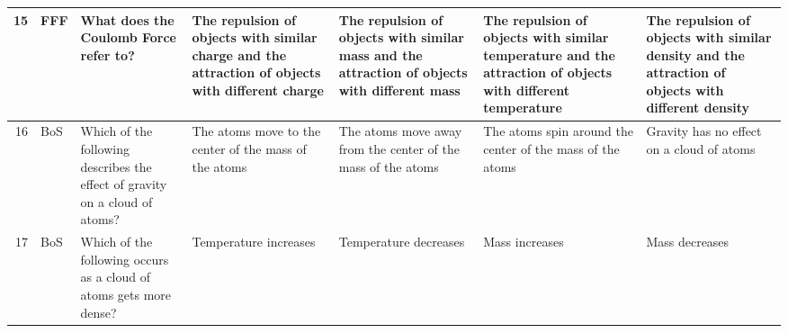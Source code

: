 \documentclass[10pt]{article}
\begin{document}
\begin{tiny}
\begin{longtable}{r|p{0.375in}|p{1.275in}|p{0.75in}|p{0.75in}|p{0.75in}|p{0.75in}}
    15    &     FFF &                                                                                                                                                                                                                                            What does the Coulomb Force refer to? &                                      The repulsion of objects with similar charge and the attraction of objects with different charge &          The repulsion of objects with similar mass and the attraction of objects with different mass &                 The repulsion of objects with similar temperature and the attraction of objects with different temperature &                                The repulsion of objects with similar density and the attraction of objects with different density \\\hline
    16    &     BoS &                                                                                                                                                                                                      Which of the following describes the effect of gravity on a cloud of atoms? &                                                                                 The atoms move to the center of the mass of the atoms &                                          The atoms move away from the center of the mass of the atoms &                                                                  The atoms spin around the center of the mass of the atoms &                                                                                         Gravity has no effect on a cloud of atoms \\\hline
    17    &     BoS &                                                                                                                                                                                                               Which of the following occurs as a cloud of atoms gets more dense? &                                                                                                                 Temperature increases &                                                                                 Temperature decreases &                                                                                                             Mass increases &                                                                                                                    Mass decreases \\\hline

\end{longtable}
\end{tiny}
\end{document}
